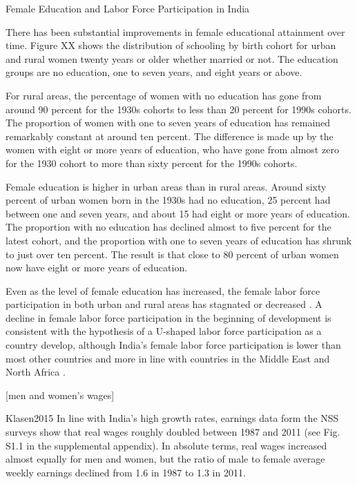 Female Education and Labor Force Participation in India

There has been substantial improvements in female educational attainment over time.
Figure XX shows the distribution of schooling by birth cohort for urban and rural women 
twenty years or older whether married or not.
The education groups are no education, one to seven years, and eight years or
above.

For rural areas, the percentage of women with no education has gone from around 90 percent
for the 1930s cohorts to less than 20 percent for 1990s cohorts. 
The proportion of women with one to seven years of education has remained remarkably
constant at around ten percent.
The difference is made up by the women with eight or more years of education, who have
gone from almost zero for the 1930 cohort to more than sixty percent for the 1990s cohorts.

Female education is higher in urban areas than in rural areas.
Around sixty percent of urban women born in the 1930s had no education, 25 percent had
between one and seven years, and about 15 had eight or more years of education.
The proportion with no education has declined almost to five percent for the latest
cohort, and the proportion with one to seven years of education has shrunk to just over
ten percent.
The result is that close to 80 percent of urban women now have eight or more years of
education.


Even as the level of female education has increased, the female labor force participation 
in both urban and rural areas has stagnated or decreased
\citep{Klasen2015,Afridi2018,Bhargava2018, Chatterjee2018, Bhargava2019}.
A decline in female labor force participation in the beginning of development is
consistent with the hypothesis of a U-shaped labor force participation as a country
develop, although India's female labor force participation is lower than most other
countries and more in line with countries in the Middle East and North Africa  
\citep{Goldin1994,Klasen2015,Chatterjee2018}.



[men and women's wages]

Klasen2015
In line with India’s high growth rates, earnings data form the NSS
surveys show that real wages roughly doubled between 1987 and 2011 (see
Fig. S1.1 in the supplemental appendix). In absolute terms, real wages
increased almost equally for men and women, but the ratio of male to
female average weekly earnings declined from 1.6 in 1987 to 1.3 in 2011.


